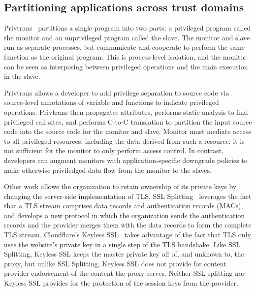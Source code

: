 \subsection{Partitioning applications across trust domains} 


%
Privtrans~\cite{privtrans} partitions a single program into two parts: a
privileged program called the monitor and an unprivileged program called the
slave. 
%
The monitor and slave run as separate processes, but communicate and cooperate
to perform the same function as the original program.
%
This is process-level isolation, and the monitor can be seen as interposing
between privileged operations and the main execution in the slave.


Privtrans allows a developer to add privilege separation to source code via
source-level annotations of variable and functions to indicate privileged
operations.  
%
Privtrans then propagates attributes, performs static analysis to find
privileged call sites, and performs C-to-C translation to partition the input
source code into the source code for the monitor and slave. 
%
Monitor must mediate access to all privileged resources, including the data
derived from such a resource; it is not sufficient for the monitor to only
perform access control.
%
In contrast, developers can augment monitors with application-specific
downgrade policies to make otherwise priviledged data flow from the monitor to
the slaves.  


%
Other work allows the organization to retain ownership of its private keys by
changing the server-side implementation of TLS\@.
%
SSL Splitting~\cite{ssl-splitting} leverages the fact that a TLS stream
comprises data records and authentication records (MACs), and develops a new
protocol in which the organization sends the authentication records and the
provider merges them with the data records to form the complete TLS stream.
%
Cloudflare's Keyless SSL~\cite{keyless-ssl} takes advantage of the fact that
TLS only uses the website's private key in a single step of the TLS handshake.
%
Like SSL Splitting, Keyless SSL keeps the master private key off of, and unknown
to, the proxy, but unlike SSL Splitting, Keyless SSL does not provide for
content provider endorsement of the content the proxy serves.  
%
Neither SSL splitting nor Keyless SSL provides for the protection of the
session keys from the provider.


